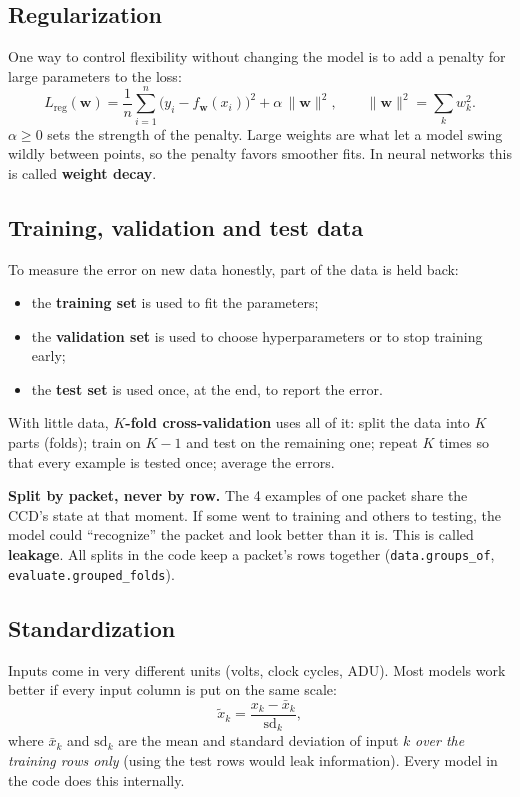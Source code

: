 \documentclass[11pt]{article}
\newcommand{\code}[1]{\texttt{#1}}
\begin{document}
\subsection{Regularization}
One way to control flexibility without changing the model is to add a penalty for large parameters to the loss:
\begin{equation}
L_\text{reg}(\bm w) = \frac1n\sum_{i=1}^{n}\bigl(y_i - f_{\bm w}(x_i)\bigr)^2 + \alpha\,\lVert\bm w\rVert^2,
\qquad \lVert\bm w\rVert^2 = \sum_k w_k^2 .
\end{equation}
$\alpha \geq 0$ sets the strength of the penalty. Large weights are what let a model swing wildly between points, so the penalty
favors smoother fits. In neural networks this is called \textbf{weight decay}.

\subsection{Training, validation and test data}
To measure the error on new data honestly, part of the data is held back:
\begin{itemize}
\item the \textbf{training set} is used to fit the parameters;
\item the \textbf{validation set} is used to choose hyperparameters or to stop training early;
\item the \textbf{test set} is used once, at the end, to report the error.
\end{itemize}
With little data, \textbf{$K$-fold cross-validation} uses all of it: split the data into $K$ parts (folds); train on $K-1$ and
test on the remaining one; repeat $K$ times so that every example is tested once; average the errors.

\begin{ours}
\textbf{Split by packet, never by row.} The 4 examples of one packet share the CCD's state at that moment. If some went to
training and others to testing, the model could ``recognize'' the packet and look better than it is. This is called
\textbf{leakage}. All splits in the code keep a packet's rows together (\code{data.groups\_of}, \code{evaluate.grouped\_folds}).
\end{ours}

\subsection{Standardization}
Inputs come in very different units (volts, clock cycles, ADU). Most models work better if every input column is put on the
same scale:
\begin{equation}
\tilde x_k = \frac{x_k - \bar x_k}{\mathrm{sd}_k},
\end{equation}
where $\bar x_k$ and $\mathrm{sd}_k$ are the mean and standard deviation of input $k$ \emph{over the training rows only} (using
the test rows would leak information). Every model in the code does this internally.
\end{document}

